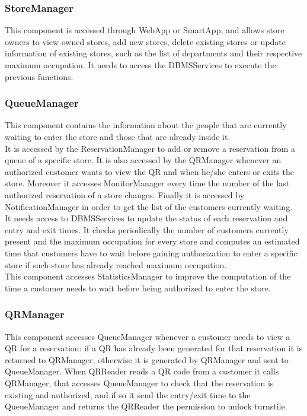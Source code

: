\subsubsection{StoreManager}
This component is accessed through WebApp or SmartApp, and allows store owners to view owned stores, add new stores, delete existing stores or update information of existing stores, such as the list of departments and their respective maximum occupation. It needs to access the DBMSServices to execute the previous functions.
\subsubsection{QueueManager}
This component contains the information about the people that are currently waiting to enter the store and those that are already inside it.\\
It is accessed by the ReservationManager to add or remove a reservation from a queue of a specific store.
It is also accessed by the QRManager whenever an authorized customer wants to view the QR and when he/she enters or exits the store.
Moreover it accesses MonitorManager every time the number of the last authorized reservation of a store changes.
Finally it is accessed by NotificationManager in order to get the list of the customers currently waiting.\\
It needs access to DBMSServices to update the status of each reservation and entry and exit times. It checks periodically the number of customers currently present and the maximum occupation for every store and computes an estimated time that customers have to wait before gaining authorization to enter a specific store if such store has already reached maximum occupation.\\
This component accesses StatisticsManager to improve the computation of the time a customer needs to wait before being authorized to enter the store.
\subsubsection{QRManager}
This component accesses QueueManager whenever a customer needs to view a QR for a reservation: if a QR has already been generated for that reservation it is returned to QRManager, otherwise it is generated by QRManager and sent to QueueManager. When QRReader reads a QR code from a customer it calls QRManager, that accesses QueueManager to check that the reservation is existing and authorized, and if so it send the entry/exit time to the QueueManager and returns the QRReader the permission to unlock turnstile.

